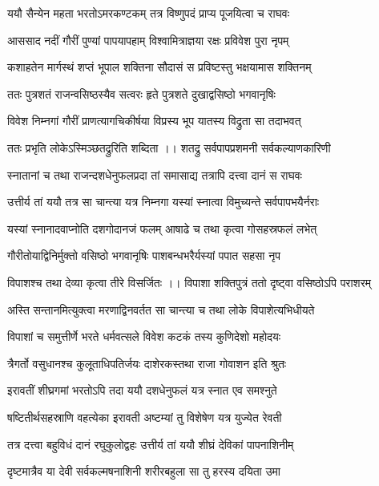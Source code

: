 \twolineshloka
{ययौ सैन्येन महता भरतोऽमरकण्टकम्}
{तत्र विष्णुपदं प्राप्य पूजयित्वा च राघवः}%

\twolineshloka
{आससाद नदीं गौरीं पुण्यां पापयापहाम्}
{विश्वामित्राज्ञया रक्षः प्रविवेश पुरा नृपम्} %

\twolineshloka
{कशाहतेन मार्गस्थं शप्तं भूपाल शक्तिना}
{सौदासं स प्रविष्टस्तु भक्षयामास शक्तिनम्}%

\twolineshloka
{ततः पुत्रशतं राजन्वसिष्ठस्यैव सत्वरः}
{हृते पुत्रशते दुखाद्वसिष्ठो भगवानृषिः}%

\twolineshloka
{विवेश निम्नगां गौरीं प्राणत्यागचिकीर्षया}
{विप्रस्य भूप यातस्य विद्रुता सा तदाभवत्}%

\twolineshloka
{ततः प्रभृति लोकेऽस्मिञ्छतद्रुरिति शब्दिता ।। शतद्रु}
{सर्वपापप्रशमनी सर्वकल्याणकारिणी}%

\twolineshloka
{स्नातानां च तथा राजन्दशधेनुफलप्रदा}
{तां समासाद्य तत्रापि दत्त्वा दानं स राघवः}%

\twolineshloka
{उत्तीर्य तां ययौ तत्र सा चान्त्या यत्र निम्नगा}
{यस्यां स्नात्वा विमुच्यन्ते सर्वपापभयैर्नराः}%

\twolineshloka
{यस्यां स्नानादवाप्नोति दशगोदानजं फलम्}
{आषाढे च तथा कृत्वा गोसहस्रफलं लभेत्}%

\twolineshloka
{गौरीतोयाद्विनिर्मुक्तो वसिष्ठो भगवानृषिः}
{पाशबन्धभरैर्यस्यां पपात सहसा नृप}%

\twolineshloka
{विपाशश्च तथा देव्या कृत्वा तीरे विसर्जितः ।। विपाशा}
{शक्तिपुत्रं ततो दृष्ट्वा वसिष्ठोऽपि पराशरम्}%

\twolineshloka
{अस्ति सन्तानमित्युक्त्वा मरणाद्विनवर्तत}
{सा चान्त्या च तथा लोके विपाशेत्यभिधीयते} %

\twolineshloka
{विपाशां च समुत्तीर्णे भरते धर्मवत्सले}
{विवेश कटकं तस्य कुणिदेशो महोदयः}%

\twolineshloka
{त्रैगर्तो वसुधानश्च कुलूताधिपतिर्जयः}
{दाशेरकस्तथा राजा गोवाशन इति श्रुतः}%

\twolineshloka
{इरावतीं शीघ्रगमां भरतोऽपि तदा ययौ}
{दशधेनुफलं यत्र स्नात एव समश्नुते}%

\twolineshloka
{षष्टितीर्थसहस्राणि वहत्येका इरावती}
{अष्टम्यां तु विशेषेण यत्र युज्येत रेवती}%

\twolineshloka
{तत्र दत्त्वा बहुविधं दानं रघुकुलोद्वहः}
{उत्तीर्य तां ययौ शीघ्रं देविकां पापनाशिनीम्}%

\twolineshloka
{दृष्टमात्रैव या देवी सर्वकल्मषनाशिनी}
{शरीरबहुला सा तु हरस्य दयिता उमा}%

